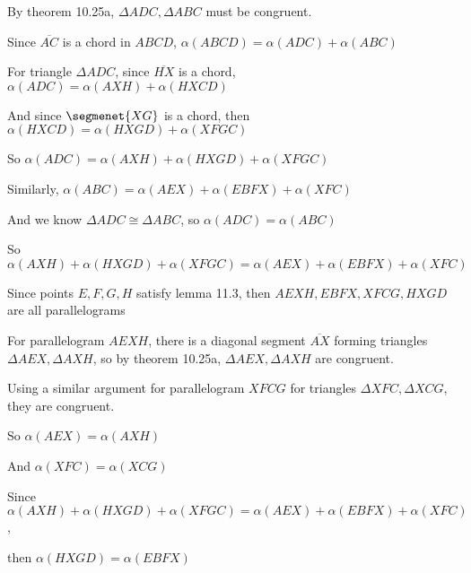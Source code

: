 \documentclass[11pt]{article}
\newcommand{\segment}[1]{\overline{#1}}
\begin{document}
\begin{itemize}
		By theorem 10.25a, $\Delta ADC, \Delta ABC$ must be congruent.

		Since $\segment{AC}$ is a chord in $ABCD$, $\alpha(ABCD) = \alpha(ADC) + \alpha(ABC)$

		For triangle $\Delta ADC$, since $\segment{HX}$ is a chord, $\alpha(ADC) = \alpha(AXH) + \alpha(HXCD)$

		And since $\segmenet{XG}$ is a chord, then $\alpha(HXCD) = \alpha(HXGD) + \alpha(XFGC)$

		So $\alpha(ADC) = \alpha(AXH) + \alpha(HXGD) + \alpha(XFGC)$

		Similarly, $\alpha(ABC) = \alpha(AEX) + \alpha(EBFX) + \alpha(XFC)$

		And we know $\Delta ADC \cong \Delta ABC$, so $\alpha(ADC) = \alpha(ABC)$

		So $\alpha(AXH) + \alpha(HXGD) + \alpha(XFGC) = \alpha(AEX) + \alpha(EBFX) + \alpha(XFC)$

		Since points $E,F,G,H$ satisfy lemma 11.3, then $AEXH, EBFX, XFCG, HXGD$ are all parallelograms

		For parallelogram $AEXH$, there is a diagonal segment $\segment{AX}$ forming triangles $\Delta AEX, \Delta AXH$, so by theorem 10.25a, $\Delta AEX, \Delta AXH$ are congruent.

		Using a similar argument for parallelogram $XFCG$ for triangles $\Delta XFC, \Delta XCG$, they are congruent.

		So $\alpha(AEX) = \alpha(AXH)$

		And $\alpha(XFC) = \alpha(XCG)$

		Since $\alpha(AXH) + \alpha(HXGD) + \alpha(XFGC) = \alpha(AEX) + \alpha(EBFX) + \alpha(XFC)$,

		then $\alpha(HXGD) = \alpha(EBFX)$
\end{itemize}
\end{document}
